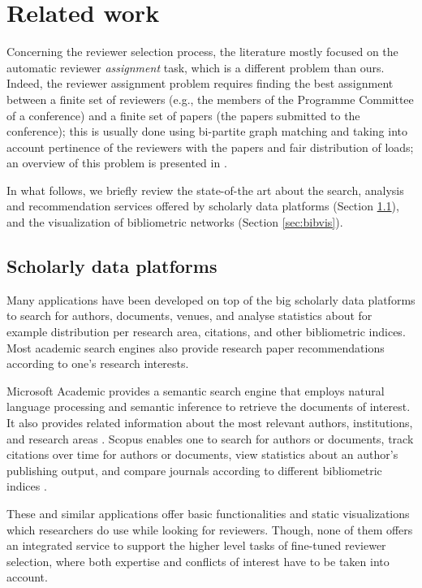 \chapter{Related work}
\label{sec:related}

Concerning the reviewer selection process, the literature mostly focused on the automatic reviewer \emph{assignment} task, which is a different problem than ours. Indeed, the reviewer assignment problem requires finding the best assignment between a finite set of reviewers (e.g., the members of the Programme Committee of a conference) and a finite set of papers (the papers submitted to the conference); this is usually done using bi-partite graph matching and taking into account pertinence of the reviewers with the papers and fair distribution of loads; an overview of this problem is presented in \cite{WaCh10}. 

In what follows, we briefly review the state-of-the art about the search, analysis and recommendation services offered by scholarly data platforms (Section \ref{sec:schoplat}), and the visualization of bibliometric networks (Section \ref{sec:bibvis}). 

\section{Scholarly data platforms}
\label{sec:schoplat}
Many applications have been developed on top of the big scholarly data platforms to search for authors, documents, venues, and analyse statistics about for example distribution per research area, citations, and other bibliometric indices. Most academic search engines also provide research paper recommendations according to one's research interests. 

Microsoft Academic provides a semantic search engine that employs natural language processing and semantic inference to retrieve the documents of interest. It also provides related information about the most relevant authors, institutions, and research areas \cite{SiZh15}. Scopus enables one to search for authors or documents,  track citations over time for authors or documents, view statistics about an author's publishing output, and compare journals according to different bibliometric indices \cite{scopus}. 

These and similar applications offer basic functionalities and static visualizations which researchers do use while looking for reviewers. Though, none of them offers an integrated service to support the higher level tasks of fine-tuned reviewer selection, where both expertise and conflicts of interest have to be taken into account. 

